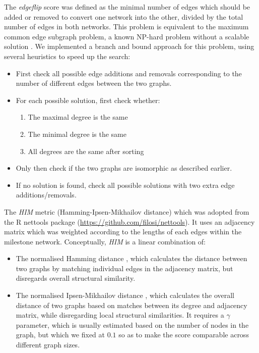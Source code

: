 The \textit{edgeflip} score was defined as the minimal number of edges which should be added or removed to convert one network into the other, divided by the total number of edges in both networks. This problem is equivalent to the maximum common edge subgraph problem, a known NP-hard problem without a scalable solution \cite{bahiense_maximumcommonedge_2012}. We implemented a branch and bound approach for this problem, using several heuristics to speed up the search:

\begin{itemize}
	\item First check all possible edge additions and removals corresponding to the number of different edges between the two graphs.
	\item For each possible solution, first check whether: \begin{enumerate}
		\item The maximal degree is the same
		\item The minimal degree is the same
		\item All degrees are the same after sorting
	\end{enumerate}
	\item Only then check if the two graphs are isomorphic as described earlier.
	\item If no solution is found, check all possible solutions with two extra edge additions/removals.
\end{itemize}

The \textit{HIM} metric (Hamming-Ipsen-Mikhailov distance) \cite{jurman_himglocalmetric_2015} which was adopted from the R nettools package (\href{https://github.com/filosi/nettools}{https://github.com/filosi/nettools}). It uses an adjacency matrix which was weighted according to the lengths of each edges within the milestone network. Conceptually, \textit{HIM} is a linear combination of:

\begin{itemize}
	\item The normalised Hamming distance \cite{dougherty_validationgeneregulatory_2011}, which calculates the distance between two graphs by matching individual edges in the adjacency matrix, but disregards overall structural similarity.
	\item The normalised Ipsen-Mikhailov distance \cite{ipsen_evolutionaryreconstructionnetworks_2002}, which calculates the overall distance of two graphs based on matches between its degree and adjacency matrix, while disregarding local structural similarities. It requires a $\gamma$ parameter, which is usually estimated based on the number of nodes in the graph, but which we fixed at $0.1$ so as to make the score comparable across different graph sizes.
\end{itemize}

